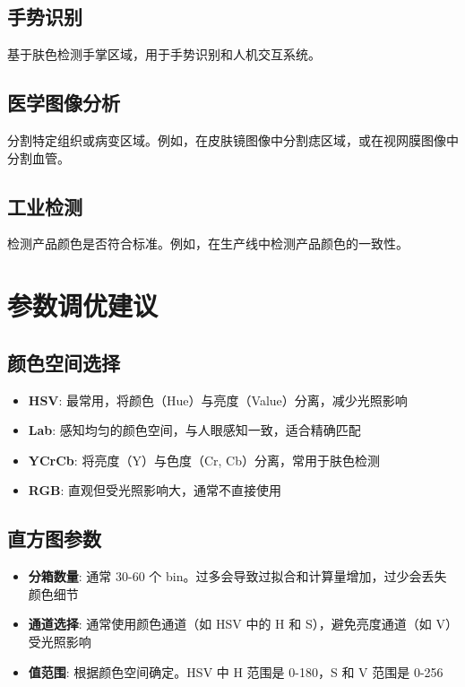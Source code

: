 \documentclass{article}
\begin{document}
\subsection{手势识别}
基于肤色检测手掌区域，用于手势识别和人机交互系统。

\subsection{医学图像分析}
分割特定组织或病变区域。例如，在皮肤镜图像中分割痣区域，或在视网膜图像中分割血管。

\subsection{工业检测}
检测产品颜色是否符合标准。例如，在生产线中检测产品颜色的一致性。

\section{参数调优建议}

\subsection{颜色空间选择}
\begin{itemize}
    \item \textbf{HSV}: 最常用，将颜色（Hue）与亮度（Value）分离，减少光照影响
    \item \textbf{Lab}: 感知均匀的颜色空间，与人眼感知一致，适合精确匹配
    \item \textbf{YCrCb}: 将亮度（Y）与色度（Cr, Cb）分离，常用于肤色检测
    \item \textbf{RGB}: 直观但受光照影响大，通常不直接使用
\end{itemize}

\subsection{直方图参数}
\begin{itemize}
    \item \textbf{分箱数量}: 通常 30-60 个 bin。过多会导致过拟合和计算量增加，过少会丢失颜色细节
    \item \textbf{通道选择}: 通常使用颜色通道（如 HSV 中的 H 和 S），避免亮度通道（如 V）受光照影响
    \item \textbf{值范围}: 根据颜色空间确定。HSV 中 H 范围是 0-180，S 和 V 范围是 0-256
\end{itemize}
\end{document}
